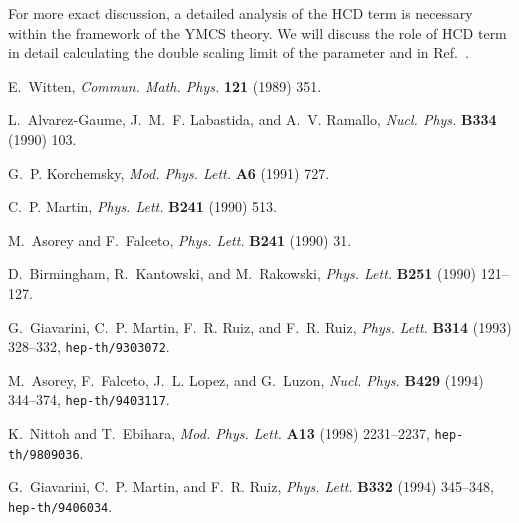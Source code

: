 \documentclass[a4paper,12pt]{article}
\begin{document}
For more exact discussion,
a detailed analysis of the HCD term is necessary
within the framework of the YMCS theory.
%
We will discuss the role of HCD term in detail
calculating the double scaling limit
of the parameter \myHighlight{$\mu$}\coordHE{} and \myHighlight{$\Lambda$}\coordHE{}
in Ref.~\cite{Nittoh:2001full}.




%
\providecommand{\href}[2]{#2}\begingroup\raggedright\begin{thebibliography}{1}

E.~Witten,
{\em Commun. Math. Phys.} {\bf 121} (1989)
351.

L.~Alvarez-Gaume, J.~M.~F. Labastida, and A.~V. Ramallo,
{\em Nucl. Phys.} {\bf B334} (1990) 103.

G.~P. Korchemsky, 
{\em Mod. Phys. Lett.} {\bf A6} (1991) 727.

C.~P. Martin, 
{\em Phys. Lett.} {\bf B241} (1990) 513.

M.~Asorey and F.~Falceto,
  {\em Phys. Lett.} {\bf B241} (1990) 31.

D.~Birmingham, R.~Kantowski, and M.~Rakowski, 
{\em Phys. Lett.} {\bf B251} (1990) 121--127.

G.~Giavarini, C.~P. Martin, F.~R. Ruiz, and F.~R. Ruiz, 
{\em Phys. Lett.} {\bf B314} (1993) 328--332,
\href{http://www.arXiv.org/abs/hep-th/9303072}{{\tt hep-th/9303072}}.

M.~Asorey, F.~Falceto, J.~L. Lopez, and G.~Luzon,
{\em Nucl. Phys.} {\bf B429} (1994) 344--374,
\href{http://www.arXiv.org/abs/hep-th/9403117}{{\tt hep-th/9403117}}.

K.~Nittoh and T.~Ebihara,
{\em Mod. Phys. Lett.} {\bf A13} (1998) 2231--2237,
\href{http://www.arXiv.org/abs/hep-th/9809036}{{\tt hep-th/9809036}}.

G.~Giavarini, C.~P. Martin, and F.~R. Ruiz,
{\em Phys. Lett.} {\bf B332} (1994) 345--348,
\href{http://www.arXiv.org/abs/hep-th/9406034}{{\tt hep-th/9406034}}.


\end{thebibliography}
\end{document}
